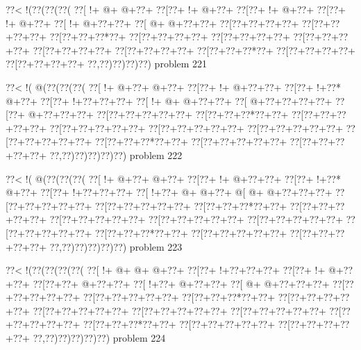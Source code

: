 \vbox{\vbox{\goo
\0??<\- !(\0??(\0??(\0??(
\0??[\- !+\- @+\- @+\0??+
\0??[\0??+\- !+\- @+\0??+
\0??[\0??+\- !+\- @+\0??+
\0??[\0??+\- !+\- @+\0??+
\0??[\- !+\- @+\0??+\0??+
\0??[\- @+\- @+\0??+\0??+
\0??[\0??+\0??+\0??+\0??+
\0??[\0??+\0??+\0??+\0??+
\0??[\0??+\0??+\0??*\0??+
\0??[\0??+\0??+\0??+\0??+
\0??[\0??+\0??+\0??+\0??+
\0??[\0??+\0??+\0??+\0??+
\0??[\0??+\0??+\0??+\0??+
\0??[\0??+\0??+\0??+\0??+
\0??[\0??+\0??+\0??*\0??+
\0??[\0??+\0??+\0??+\0??+
\0??[\0??+\0??+\0??+\0??+
\0??,\0??)\0??)\0??)\0??)
}
\hfil problem 221\hfil\break
}

\vbox{\vbox{\goo
\0??<\- !(\- @(\0??(\0??(\0??(
\0??[\- !+\- @+\0??+\- @+\0??+
\0??[\0??+\- !+\- @+\0??+\0??+
\0??[\0??+\- !+\0??*\- @+\0??+
\0??[\0??+\- !+\0??+\0??+\0??+
\0??[\- !+\- @+\- @+\0??+\0??+
\0??[\- @+\0??+\0??+\0??+\0??+
\0??[\0??+\- @+\0??+\0??+\0??+
\0??[\0??+\0??+\0??+\0??+\0??+
\0??[\0??+\0??+\0??*\0??+\0??+
\0??[\0??+\0??+\0??+\0??+\0??+
\0??[\0??+\0??+\0??+\0??+\0??+
\0??[\0??+\0??+\0??+\0??+\0??+
\0??[\0??+\0??+\0??+\0??+\0??+
\0??[\0??+\0??+\0??+\0??+\0??+
\0??[\0??+\0??+\0??*\0??+\0??+
\0??[\0??+\0??+\0??+\0??+\0??+
\0??[\0??+\0??+\0??+\0??+\0??+
\0??,\0??)\0??)\0??)\0??)\0??)
}
\hfil problem 222\hfil\break
}

\vbox{\vbox{\goo
\0??<\- !(\- @(\0??(\0??(\0??(
\0??[\- !+\- @+\0??+\- @+\0??+
\0??[\0??+\- !+\- @+\0??+\0??+
\0??[\0??+\- !+\0??*\- @+\0??+
\0??[\0??+\- !+\0??+\0??+\0??+
\0??[\- !+\0??+\- @+\- @+\0??+
\- @[\- @+\- @+\0??+\0??+\0??+
\0??[\0??+\0??+\0??+\0??+\0??+
\0??[\0??+\0??+\0??+\0??+\0??+
\0??[\0??+\0??+\0??*\0??+\0??+
\0??[\0??+\0??+\0??+\0??+\0??+
\0??[\0??+\0??+\0??+\0??+\0??+
\0??[\0??+\0??+\0??+\0??+\0??+
\0??[\0??+\0??+\0??+\0??+\0??+
\0??[\0??+\0??+\0??+\0??+\0??+
\0??[\0??+\0??+\0??*\0??+\0??+
\0??[\0??+\0??+\0??+\0??+\0??+
\0??[\0??+\0??+\0??+\0??+\0??+
\0??,\0??)\0??)\0??)\0??)\0??)
}
\hfil problem 223\hfil\break
}

\vbox{\vbox{\goo
\0??<\- !(\0??(\0??(\0??(\0??(
\0??[\- !+\- @+\- @+\- @+\0??+
\0??[\0??+\- !+\0??+\0??+\0??+
\0??[\0??+\- !+\- @+\0??+\0??+
\0??[\0??+\0??+\- @+\0??+\0??+
\0??[\- !+\0??+\- @+\0??+\0??+
\0??[\- @+\- @+\0??+\0??+\0??+
\0??[\0??+\0??+\0??+\0??+\0??+
\0??[\0??+\0??+\0??+\0??+\0??+
\0??[\0??+\0??+\0??*\0??+\0??+
\0??[\0??+\0??+\0??+\0??+\0??+
\0??[\0??+\0??+\0??+\0??+\0??+
\0??[\0??+\0??+\0??+\0??+\0??+
\0??[\0??+\0??+\0??+\0??+\0??+
\0??[\0??+\0??+\0??+\0??+\0??+
\0??[\0??+\0??+\0??*\0??+\0??+
\0??[\0??+\0??+\0??+\0??+\0??+
\0??[\0??+\0??+\0??+\0??+\0??+
\0??,\0??)\0??)\0??)\0??)\0??)
}
\hfil problem 224\hfil\break
}

